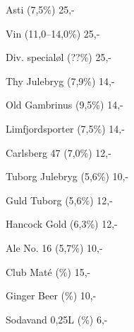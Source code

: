\documentclass{article}
\begin{document}

\maketitle

\null
\vspace{-0.8cm}


\vspace{0.5cm}

Asti {\large (7,5\%)} \hfill 25,-

\vspace{0.3cm}

Vin {\large (11,0--14,0\%)} \hfill 25,-

\vspace{0.3cm}

Div. specialøl {\large (??\%)}  \hfill 25,-

\vspace{1.3cm}

Thy Julebryg {\large (7,9\%)} \hfill 14,-

\vspace{0.3cm}

Old Gambrinus {\large (9,5\%)}  \hfill 14,-

\vspace{0.3cm}

Limfjordsporter {\large (7,5\%)}  \hfill 14,-

\vspace{0.3cm}

Carlsberg 47 {\large (7,0\%)} \hfill 12,-

\vspace{0.3cm}

Tuborg Julebryg {\large (5,6\%)} \hfill 10,-

\vspace{1.3cm}

Guld Tuborg {\large (5,6\%)} \hfill 12,-

\vspace{0.3cm}

Hancock Gold {\large (6,3\%)} \hfill 12,-

\vspace{0.3cm}

Ale No. 16 {\large (5,7\%)} \hfill 10,-

\vspace{1.3cm}

Club Maté {\large (\frownie{}\%)} \hfill 15,-

\vspace{0.3cm}

Ginger Beer {\large (\frownie{}\%)} \hfill 10,-

\vspace{0.3cm}

Sodavand 0,25L {\large (\frownie{}\%)}  \hfill 6,-

\vspace{0.5cm}

\underskriv
\end{document}
